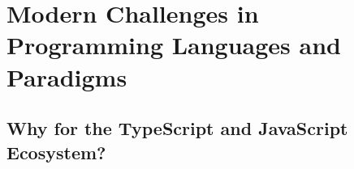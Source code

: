 \chapter{Modern Challenges in Programming Languages and Paradigms}






\section{Why  for the TypeScript and JavaScript Ecosystem?}








